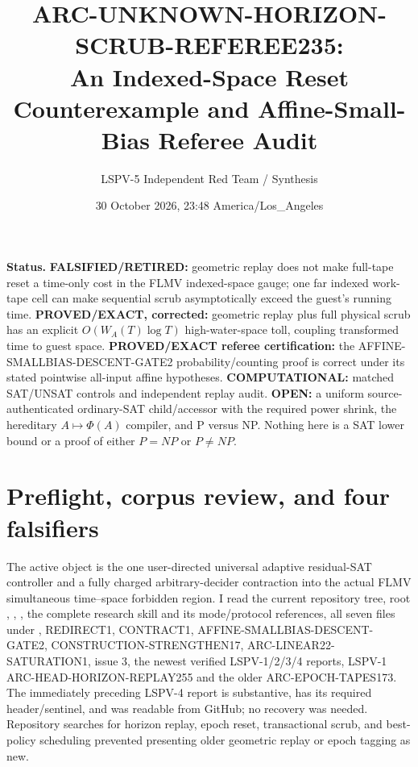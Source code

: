 \documentclass[11pt]{article}
\title{ARC-UNKNOWN-HORIZON-SCRUB-REFEREE235:\\
An Indexed-Space Reset Counterexample and Affine-Small-Bias Referee Audit}
\author{LSPV-5 Independent Red Team / Synthesis}
\date{30 October 2026, 23:48 America/Los\_Angeles}
\begin{document}
\maketitle

\noindent\textbf{Status.}
\textbf{FALSIFIED/RETIRED:} geometric replay does not make full-tape reset a
time-only cost in the FLMV indexed-space gauge; one far indexed work-tape cell
can make sequential scrub asymptotically exceed the guest's running time.
\textbf{PROVED/EXACT, corrected:} geometric replay plus full physical scrub has
an explicit $O(W_A(T)\log T)$ high-water-space toll, coupling transformed time
to guest space.
\textbf{PROVED/EXACT referee certification:} the
AFFINE-SMALLBIAS-DESCENT-GATE2 probability/counting proof is correct under its
stated pointwise all-input affine hypotheses.  \textbf{COMPUTATIONAL:} matched
SAT/UNSAT controls and independent replay audit.  \textbf{OPEN:} a uniform
source-authenticated ordinary-SAT child/accessor with the required power shrink,
the hereditary $A\mapsto\Phi(A)$ compiler, and P versus NP.  Nothing here is a
SAT lower bound or a proof of either $P=NP$ or $P\ne NP$.

\section{Preflight, corpus review, and four falsifiers}
The active object is the one user-directed universal adaptive residual-SAT
controller and a fully charged arbitrary-decider contraction into the actual
FLMV simultaneous time--space forbidden region.  I read the current repository
tree, root , , , the complete
research skill and its mode/protocol references, all seven files under
, REDIRECT1, CONTRACT1, AFFINE-SMALLBIAS-DESCENT-GATE2,
CONSTRUCTION-STRENGTHEN17, ARC-LINEAR22-SATURATION1, issue 3, the newest verified
LSPV-1/2/3/4 reports, LSPV-1 ARC-HEAD-HORIZON-REPLAY255 and the older
ARC-EPOCH-TAPES173.  The immediately preceding LSPV-4 report is substantive,
has its required header/sentinel, and was readable from GitHub; no recovery was
needed.  Repository searches for horizon replay, epoch reset, transactional
scrub, and best-policy scheduling prevented presenting older geometric replay
or epoch tagging as new.
\end{document}
